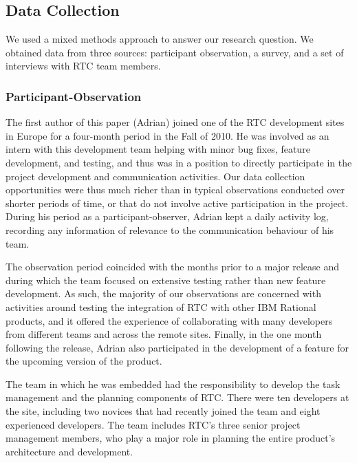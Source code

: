 \documentclass[12pt,oneside]{book}
\begin{document}
\subsection{Data Collection}

We used a mixed methods approach to answer our research question. We obtained data from three sources: participant observation, a survey, and a set of interviews with RTC team members.

\subsubsection{Participant-Observation}

The first author of this paper (Adrian) joined one of the RTC development sites in Europe for a four-month period in the Fall of 2010. He was involved as an intern with this development team helping with minor bug fixes, feature development, and testing, and thus was in a position to directly participate in the project development and communication activities. Our data collection opportunities were thus much richer than in typical observations conducted over shorter periods of time, or that do not involve active participation in the project.  During his period as a participant-observer, Adrian kept a daily activity log, recording any information of relevance to the communication behaviour of his team.

The observation period coincided with the months prior to a major release and during which the team focused on extensive testing rather than new feature development. As such, the majority of our observations are concerned with activities around testing the integration of RTC with other IBM Rational products, and it offered the experience of collaborating with many developers from different teams and across the remote sites. Finally, in the one month following the release, Adrian also participated in the development of a feature for the upcoming version of the product.

The team in which he was embedded had the responsibility to develop the task management and the planning components of RTC. There were ten developers at the site, including two novices that had recently joined the team and eight experienced developers. The team includes RTC's three senior project management members, who play a major role in planning the entire product's architecture and development.
\end{document}
